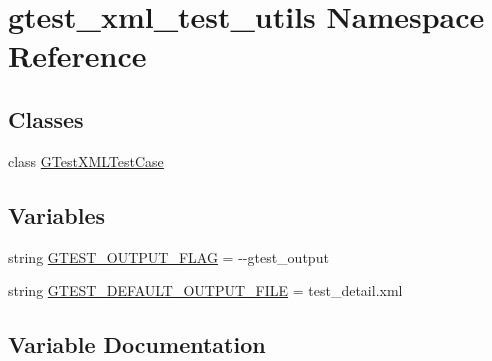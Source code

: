 \hypertarget{namespacegtest__xml__test__utils}{}\section{gtest\+\_\+xml\+\_\+test\+\_\+utils Namespace Reference}
\label{namespacegtest__xml__test__utils}
\subsection*{Classes}
\begin{DoxyCompactItemize}
\item 
class \hyperlink{classgtest__xml__test__utils_1_1GTestXMLTestCase}{G\+Test\+X\+M\+L\+Test\+Case}
\end{DoxyCompactItemize}
\subsection*{Variables}
\begin{DoxyCompactItemize}
\item 
string \hyperlink{namespacegtest__xml__test__utils_aa354c3ca453d90f496f4cbc576406fb2}{G\+T\+E\+S\+T\+\_\+\+O\+U\+T\+P\+U\+T\+\_\+\+F\+L\+AG} = \textquotesingle{}-\/-\/gtest\+\_\+output\textquotesingle{}
\item 
string \hyperlink{namespacegtest__xml__test__utils_aebe969ed368778716d0619214ff7b853}{G\+T\+E\+S\+T\+\_\+\+D\+E\+F\+A\+U\+L\+T\+\_\+\+O\+U\+T\+P\+U\+T\+\_\+\+F\+I\+LE} = \textquotesingle{}test\+\_\+detail.\+xml\textquotesingle{}
\end{DoxyCompactItemize}


\subsection{Variable Documentation}
